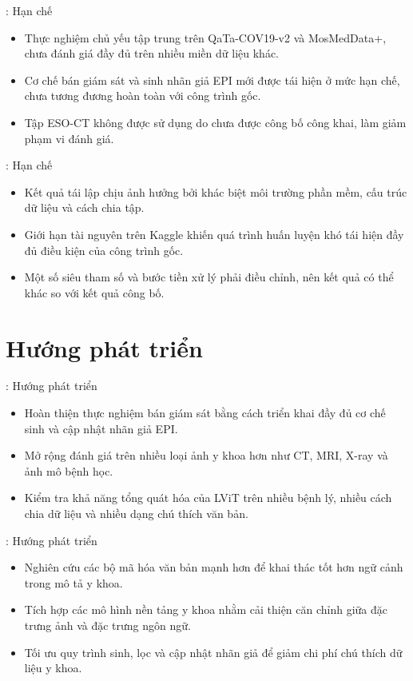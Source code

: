 \begin{frame}{\secname: Hạn chế}
\begin{itemize}
    \item Thực nghiệm chủ yếu tập trung trên QaTa-COV19-v2 và MosMedData+, chưa đánh giá đầy đủ trên nhiều miền dữ liệu khác.
    \item Cơ chế bán giám sát và sinh nhãn giả EPI mới được tái hiện ở mức hạn chế, chưa tương đương hoàn toàn với công trình gốc.
    \item Tập ESO-CT không được sử dụng do chưa được công bố công khai, làm giảm phạm vi đánh giá.
\end{itemize}
\end{frame}

\begin{frame}{\secname: Hạn chế}
\begin{itemize}
    \item Kết quả tái lập chịu ảnh hưởng bởi khác biệt môi trường phần mềm, cấu trúc dữ liệu và cách chia tập.
    \item Giới hạn tài nguyên trên Kaggle khiến quá trình huấn luyện khó tái hiện đầy đủ điều kiện của công trình gốc.
    \item Một số siêu tham số và bước tiền xử lý phải điều chỉnh, nên kết quả có thể khác so với kết quả công bố.
\end{itemize}
\end{frame}

\section{Hướng phát triển}

\begin{frame}{\secname: Hướng phát triển}
\begin{itemize}
    \item Hoàn thiện thực nghiệm bán giám sát bằng cách triển khai đầy đủ cơ chế sinh và cập nhật nhãn giả EPI.
    \item Mở rộng đánh giá trên nhiều loại ảnh y khoa hơn như CT, MRI, X-ray và ảnh mô bệnh học.
    \item Kiểm tra khả năng tổng quát hóa của LViT trên nhiều bệnh lý, nhiều cách chia dữ liệu và nhiều dạng chú thích văn bản.
\end{itemize}
\end{frame}

\begin{frame}{\secname: Hướng phát triển}
\begin{itemize}
    \item Nghiên cứu các bộ mã hóa văn bản mạnh hơn để khai thác tốt hơn ngữ cảnh trong mô tả y khoa.
    \item Tích hợp các mô hình nền tảng y khoa nhằm cải thiện căn chỉnh giữa đặc trưng ảnh và đặc trưng ngôn ngữ.
    \item Tối ưu quy trình sinh, lọc và cập nhật nhãn giả để giảm chi phí chú thích dữ liệu y khoa.
\end{itemize}
\end{frame}

